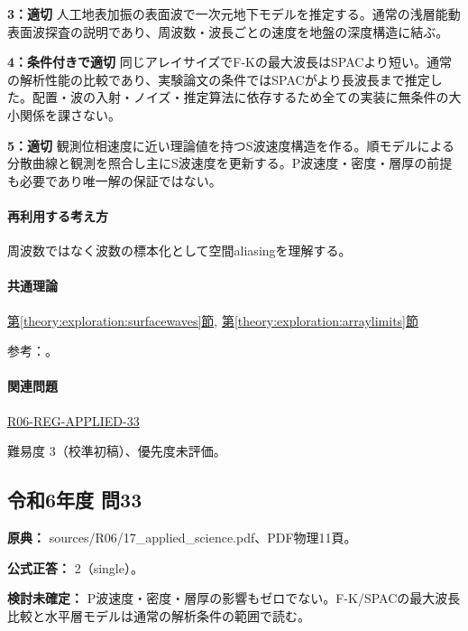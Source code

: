 \noindent\textbf{3：適切} 人工地表加振の表面波で一次元地下モデルを推定する。通常の浅層能動表面波探査の説明であり、周波数・波長ごとの速度を地盤の深度構造に結ぶ。\par

\noindent\textbf{4：条件付きで適切} 同じアレイサイズでF-Kの最大波長はSPACより短い。通常の解析性能の比較であり、実験論文の条件ではSPACがより長波長まで推定した。配置・波の入射・ノイズ・推定算法に依存するため全ての実装に無条件の大小関係を課さない。\par

\noindent\textbf{5：適切} 観測位相速度に近い理論値を持つS波速度構造を作る。順モデルによる分散曲線と観測を照合し主にS波速度を更新する。P波速度・密度・層厚の前提も必要であり唯一解の保証ではない。\par

\paragraph{再利用する考え方} 周波数ではなく波数の標本化として空間aliasingを理解する。

\paragraph{共通理論} \hyperref[theory:exploration:surfacewaves]{第\ref*{theory:exploration:surfacewaves}節}, \hyperref[theory:exploration:arraylimits]{第\ref*{theory:exploration:arraylimits}節}

\par 参考：\cite{epa_surfacewaves,xia_rayleigh1999,japansea_spac2017,array_limits2002}。

\paragraph{関連問題} \hyperref[q:r06-reg-applied-33]{R06-REG-APPLIED-33}

\par 難易度 3（校準初稿）、優先度未評価。

\subsection{令和6年度 問33}
\label{q:r06-reg-applied-33}

\noindent\textbf{原典：} sources/R06/17\_applied\_science.pdf、PDF物理11頁。

\textbf{公式正答：} 2（single）。

\par\textbf{検討未確定：} P波速度・密度・層厚の影響もゼロでない。F-K/SPACの最大波長比較と水平層モデルは通常の解析条件の範囲で読む。

